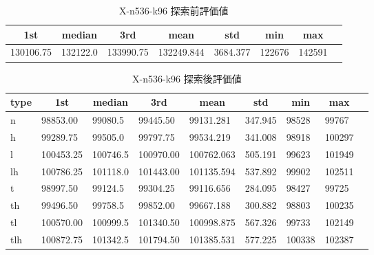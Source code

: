\begin{table}[htbp]
    \caption{X-n536-k96 探索前評価値}
    \begin{tabular}{|l|l|l|l|l|l|l|l|}\hline
    \multicolumn{1}{|c|}{\textbf{1st}}
    &\multicolumn{1}{c|}{\textbf{median}}
    &\multicolumn{1}{c|}{\textbf{3rd}}
    &\multicolumn{1}{c|}{\textbf{mean}}
    &\multicolumn{1}{c|}{\textbf{std}}
    &\multicolumn{1}{c|}{\textbf{min}}
    &\multicolumn{1}{c|}{\textbf{max}}\\\hline
	130106.75 & 132122.0 & 133990.75 & 132249.844 & 3684.377 & 122676 & 142591\\\hline
	\end{tabular}
\end{table}
\begin{table}[htbp]
    \caption{X-n536-k96 探索後評価値}
    \begin{tabular}{|l|l|l|l|l|l|l|l|l|}\hline
    \multicolumn{1}{|c|}{\textbf{type}}
    &\multicolumn{1}{|c|}{\textbf{1st}}
    &\multicolumn{1}{c|}{\textbf{median}}
    &\multicolumn{1}{c|}{\textbf{3rd}}
    &\multicolumn{1}{c|}{\textbf{mean}}
    &\multicolumn{1}{c|}{\textbf{std}}
    &\multicolumn{1}{c|}{\textbf{min}}
    &\multicolumn{1}{c|}{\textbf{max}}\\\hline
	n & 98853.00 & 99080.5 & 99445.50 & 99131.281 & 347.945 & 98528 & 99767\\\hline
	h & 99289.75 & 99505.0 & 99797.75 & 99534.219 & 341.008 & 98918 & 100297\\\hline
	l & 100453.25 & 100746.5 & 100970.00 & 100762.063 & 505.191 & 99623 & 101949\\\hline
	lh & 100786.25 & 101118.0 & 101443.00 & 101135.594 & 537.892 & 99902 & 102511\\\hline
	t & 98997.50 & 99124.5 & 99304.25 & 99116.656 & 284.095 & 98427 & 99725\\\hline
	th & 99496.50 & 99758.5 & 99852.00 & 99667.188 & 300.882 & 98803 & 100235\\\hline
	tl & 100570.00 & 100999.5 & 101340.50 & 100998.875 & 567.326 & 99733 & 102149\\\hline
	tlh & 100872.75 & 101342.5 & 101794.50 & 101385.531 & 577.225 & 100338 & 102387\\\hline
	\end{tabular}
\end{table}
